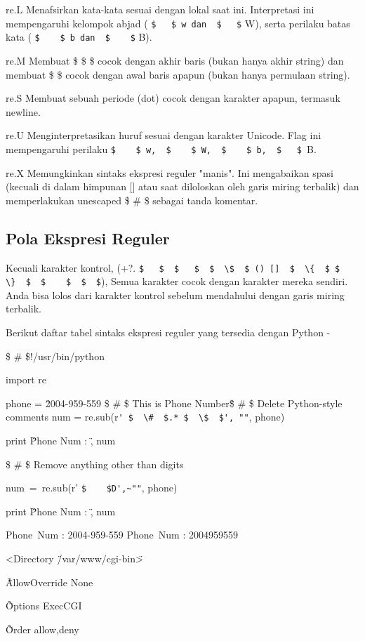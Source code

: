 \begin {enumerate}
\begin {enumerate}
re.L
Menafsirkan kata-kata sesuai dengan lokal saat ini. Interpretasi ini mempengaruhi kelompok abjad ( \verb|$   $ w dan  $   $| W), serta perilaku batas kata ( \verb|$    $ b dan  $    $| B).

re.M
Membuat  \$  \$  \$ cocok dengan akhir baris (bukan hanya akhir string) dan membuat  \$   \$ cocok dengan awal baris apapun (bukan hanya permulaan string).

re.S
Membuat sebuah periode (dot) cocok dengan karakter apapun, termasuk newline.

re.U
Menginterpretasikan huruf sesuai dengan karakter Unicode. Flag ini mempengaruhi perilaku  \verb|$    $ w,  $    $ W,  $    $ b,  $   $ |B.

re.X
Memungkinkan sintaks ekspresi reguler "manis". Ini mengabaikan spasi (kecuali di dalam himpunan [] atau saat diloloskan oleh garis miring terbalik) dan memperlakukan unescaped  \$  \#  \$ sebagai tanda komentar.

\subsection{Pola Ekspresi Reguler}
Kecuali karakter kontrol, (+?.  \verb|$   $  $   $  $  \$  $ () []  $  \{  $ $  \}  $  $    $  $  $|), Semua karakter cocok dengan karakter mereka sendiri. Anda bisa lolos dari karakter kontrol sebelum mendahului dengan garis miring terbalik.

Berikut daftar tabel sintaks ekspresi reguler yang tersedia dengan Python -

 \$  \#  \$!/usr/bin/python

import re

phone = \"2004-959-559  \$  \#  \$ This is Phone Number\"

 \$  \#  \$ Delete Python-style comments
num = re.sub(r\verb|' $  \#  $.* $  \$  $', ""|, phone)

print \"Phone Num : \", num

 \$  \#  \$ Remove anything other than digits

num~=~re.sub(r' \verb|$    $D',~""|, phone)

print \"Phone Num : \", num

Phone~Num :  2004-959-559
Phone~Num :  2004959559

<Directory \"/var/www/cgi-bin\">

\~\~ AllowOverride None

\~\~ Options ExecCGI

\~\~ Order allow,deny


\end{enumerate}
\end{enumerate}
